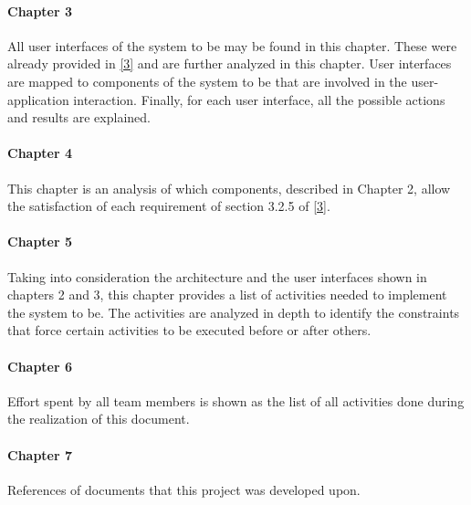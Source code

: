 \documentclass[../DD.tex]{subfiles}
\begin{document}
		\paragraph{Chapter 3}
			All user interfaces of the system to be may be found in this chapter. These were already provided in \hyperref[ref:3]{[3]} and are further analyzed in this chapter. User interfaces are mapped to components of the system to be that are involved in the user-application interaction. Finally, for each user interface, all the possible actions and results are explained. 
		\paragraph{Chapter 4}
			This chapter is an analysis of which components, described in Chapter 2, allow the satisfaction of each requirement of section 3.2.5 of \hyperref[ref:3]{[3]}. 
		\paragraph{Chapter 5}
			Taking into consideration the architecture and the user interfaces shown in chapters 2 and 3, this chapter provides a list of activities needed to implement the system to be. The activities are analyzed in depth to identify the constraints that force certain activities to be executed before or after others. 
		\paragraph{Chapter 6}
			Effort spent by all team members is shown as the list of all activities done during the realization of this document.
		\paragraph{Chapter 7}
			References of documents that this project was developed upon.
		
\end{document}
